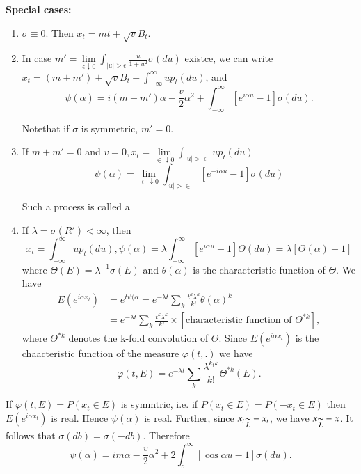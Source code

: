 \noindent
\textbf{Special cases:}
\begin{enumerate}
\item $\sigma \equiv 0$. Then $x_t = m t + \sqrt{v} B_t$.

\item In case $m'  = \lim\limits_{\epsilon \downarrow 0} \int_{| u | >
  \epsilon} \frac{u}{1+ u^2} \sigma (du)$ existce, we can write $x_t = (m+
  m')+ \sqrt{v} B_t + \int_{- \infty}^\infty u p_t (du)$, and  
$$
\psi ( \alpha) = i (m+ m') \alpha - \frac{v}{2} \alpha^2 + \int_{-
 \infty}^\infty [e^{i \alpha u}- 1] \sigma (du). 
$$

Note\pageoriginale that if $\sigma$  is symmetric, $m' =0$.

\item If $m+ m' =0$ and $v=0, x_t = \lim\limits_{\in \downarrow 0}
  \int_{| u | >\in } u p_t (du)$ 
  $$
  \psi ( \alpha )  = \lim\limits_{\in \downarrow 0}\int_{| u | >\in} [
    e^{-i \alpha u}-1] \sigma (du) 
  $$
  
Such a process is called a 

\item If $\lambda = \sigma (R') < \infty$, then 
  $$
  x_t = \int_{- \infty}^\infty u p_t (du) , \psi ( \alpha )= \lambda
  \int_{- \infty}^\infty [e^{i \alpha u}-1] \Theta (du)  = \lambda [
    \Theta ( \alpha ) -1]  
  $$
  where $\Theta (E) = \lambda^{-1} \sigma (E)$ and $\theta(
  \alpha)$ is the characteristic function of $\Theta$. We have  
\begin{align*}  
E(e^{ i \alpha x_t}) &= e^{ t \psi ( \alpha}= e^{- \lambda t}
  \sum_{k} \frac{t^k \lambda^k}{k!} \theta ( \alpha)^k\\
  &= e^{-\lambda t} \sum_{k} \frac{t^k \lambda^k}{k !} \times 
[\text{characteristic function of }  \Theta^{* k}], 
\end{align*}
where $\Theta^{ * k}$ denotes the  k-fold convolution of
  $\Theta$. Since  $E(e^{i \alpha x_t})$ is the chaacteristic function
  of the measure $\varphi (t,.)$ we have  
  $$
  \varphi (t, E) = e^{- \lambda t} \sum_{k} \frac{\lambda^{k_t k}}{k!}
  \Theta^{* k} (E). 
  $$
\end{enumerate}

\begin{remark*}
If $\varphi  (t,E) = P (x_t \in E)$ is symmtric, i.e. if $P(x_t \in
  E)=  P(- x_t \in E)$ then $E(e^{i \alpha x_t})$ is real. Hence $\psi
  ( \alpha )$ is real. Further, since $x_t {\displaystyle{\mathop{\sim}_{L}}}- x_t$, we have $x
  {\displaystyle{\mathop{\sim}_{L}}} -x$. It follows that $\sigma (db)=  \sigma (-
  db)$. Therefore 
  $$
  \psi ( \alpha ) = i m \alpha - \frac{v}{2} \alpha^2 + 2
  \int_{o}^\infty [ \cos \alpha u-1] \sigma (du). 
  $$
\end{remark*}

